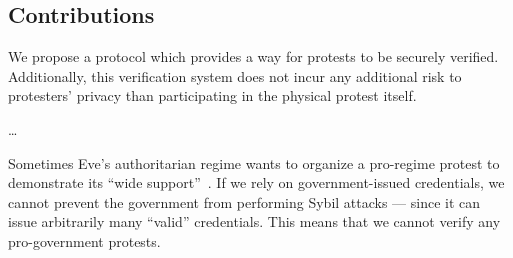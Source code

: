 \subsection{Contributions}

We propose a protocol which provides a way for protests to be securely verified.
Additionally, this verification system does not incur any additional risk to 
protesters' privacy than participating in the physical protest itself.

\dots

Sometimes Eve's authoritarian regime wants to organize a pro-regime protest to 
demonstrate its \enquote{wide 
  support}~\cite[e.g.][]{AlJazeeraOnVenezuela2017,VenezuelanStateWorkersCalledToParticipate}.
If we rely on government-issued credentials, we cannot prevent the government 
from performing Sybil attacks --- since it can issue arbitrarily many 
\enquote{valid} credentials.
This means that we cannot verify any pro-government protests.

